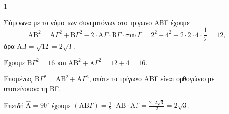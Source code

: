 \begin{ylh}{1}
    \item [ΛΥΣΗ]
\end{ylh}
\begin{alist}
    \item [α)] Σύμφωνα με το νόμο των συνημιτόνων στο τρίγωνο ΑΒΓ έχουμε
    \[
        \mathrm{AB}^2 = \mathrm{A}\Gamma^2 + \mathrm{B}\Gamma^2 - 2 \cdot \mathrm{A}\Gamma \cdot \mathrm{B}\Gamma \cdot \text{συν}\,\Gamma = 2^2 + 4^2 - 2 \cdot 2 \cdot 4 \cdot \frac{1}{2} = 12,
    \]
    άρα $\mathrm{AB} = \sqrt{12} = 2\sqrt{3}$.

    \item [β)] Έχουμε $\mathrm{B}\Gamma^2 = 16$ και $\mathrm{AB}^2 + \mathrm{A}\Gamma^2 = 12 + 4 = 16$.

    Επομένως $\mathrm{B}\Gamma^2 = \mathrm{AB}^2 + \mathrm{A}\Gamma^2$, οπότε το τρίγωνο ΑΒΓ είναι ορθογώνιο με υποτείνουσα τη ΒΓ.

    \item [γ)] Επειδή $\hat{\mathrm{A}} = 90^\circ$ έχουμε $(\mathrm{AB}\Gamma) = \frac{1}{2} \cdot \mathrm{AB} \cdot \mathrm{A}\Gamma = \frac{2 \cdot 2\sqrt{3}}{2} = 2\sqrt{3}$.
\end{alist}